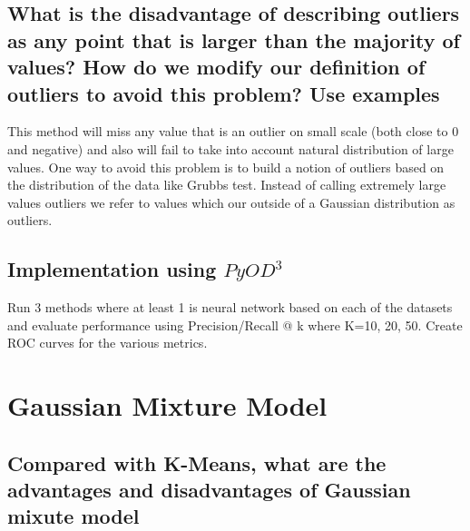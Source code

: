\documentclass[11pt]{article}
\begin{document}
\subsection{What is the disadvantage of describing outliers as any point that is larger than the majority of values? How do we modify our definition of outliers to avoid this problem? Use examples }
This method will miss any value that is an outlier on small scale (both close to 0 and negative) and also will fail to take into account natural distribution of large values. One way to avoid this problem is to build a notion of outliers based on the distribution of the data like Grubbs test. Instead of calling extremely large values outliers we refer to values which our outside of a Gaussian distribution as outliers. 
\subsection{Implementation using $PyOD^3$}
Run 3 methods where at least 1 is neural network based on each of the datasets and evaluate performance using Precision/Recall @ k where K=10, 20, 50.
Create ROC curves for the various metrics. 
\section{Gaussian Mixture Model}
\subsection{Compared with K-Means, what are the advantages and disadvantages of Gaussian mixute model}
\end{document}
